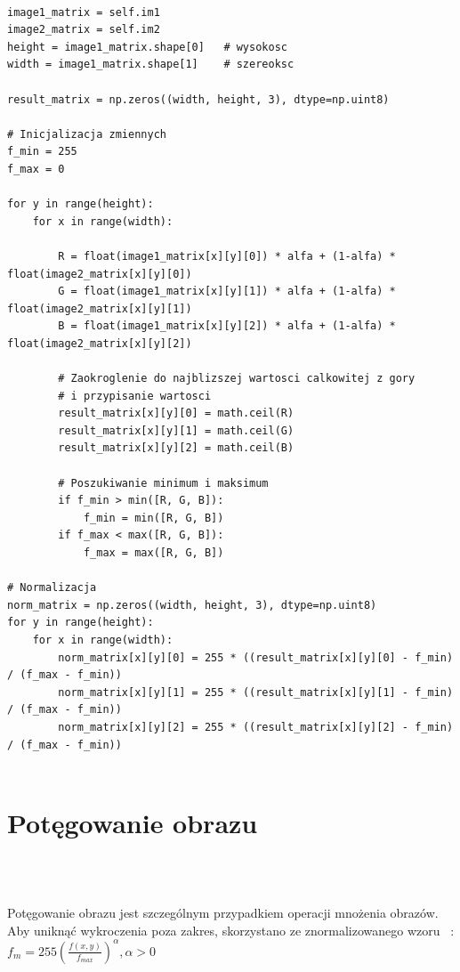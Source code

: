 \documentclass[final,a4paper,openany,12pt]{mwbk}
\begin{document}
\begin{lstlisting}[caption=Mieszanie obrazów barwowych z określonym współczynnikiem]

image1_matrix = self.im1
image2_matrix = self.im2
height = image1_matrix.shape[0]   # wysokosc
width = image1_matrix.shape[1]    # szereoksc

result_matrix = np.zeros((width, height, 3), dtype=np.uint8)

# Inicjalizacja zmiennych
f_min = 255
f_max = 0

for y in range(height):
    for x in range(width):  

        R = float(image1_matrix[x][y][0]) * alfa + (1-alfa) * float(image2_matrix[x][y][0])
        G = float(image1_matrix[x][y][1]) * alfa + (1-alfa) * float(image2_matrix[x][y][1])
        B = float(image1_matrix[x][y][2]) * alfa + (1-alfa) * float(image2_matrix[x][y][2])

        # Zaokroglenie do najblizszej wartosci calkowitej z gory
        # i przypisanie wartosci
        result_matrix[x][y][0] = math.ceil(R)
        result_matrix[x][y][1] = math.ceil(G)
        result_matrix[x][y][2] = math.ceil(B)

        # Poszukiwanie minimum i maksimum                
        if f_min > min([R, G, B]):
            f_min = min([R, G, B])
        if f_max < max([R, G, B]):
            f_max = max([R, G, B])

# Normalizacja
norm_matrix = np.zeros((width, height, 3), dtype=np.uint8)
for y in range(height):
    for x in range(width):
        norm_matrix[x][y][0] = 255 * ((result_matrix[x][y][0] - f_min) / (f_max - f_min))
        norm_matrix[x][y][1] = 255 * ((result_matrix[x][y][1] - f_min) / (f_max - f_min))
        norm_matrix[x][y][2] = 255 * ((result_matrix[x][y][2] - f_min) / (f_max - f_min))


\end{lstlisting}

\section{ Potęgowanie obrazu}

\hfill
\\\\
\indent

\begin{center} Potęgowanie obrazu jest szczególnym przypadkiem operacji mnożenia obrazów. Aby uniknąć wykroczenia poza zakres, skorzystano ze znormalizowanego wzoru ~\cite{WykRat}:
		$f_{m} = 255(\frac{f(x,y)}{f_{max}}) ^{\alpha}, \alpha > 0 $
	\end{center}
\end{document}
